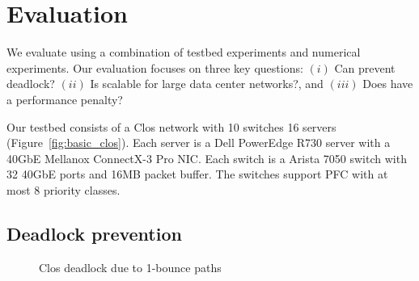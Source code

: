 \section{Evaluation}\label{sec:eval}

We evaluate \sysname{} using a combination of testbed experiments and numerical
experiments. Our evaluation focuses on three key questions: $(i)$ Can \sysname{}
prevent deadlock? $(ii)$ Is \sysname{} scalable for large data center networks?,
and $(iii)$ Does \sysname{} have a performance penalty?


 Our testbed consists of a Clos network with 10 switches 16
servers (Figure~\ref{fig:basic_clos}). Each server is a Dell PowerEdge R730
server with a 40GbE Mellanox ConnectX-3 Pro NIC. Each switch is a Arista
7050 switch with 32 40GbE ports and 16MB packet buffer. The switches
support PFC with at most 8 priority classes.




\subsection{Deadlock prevention}\label{subsec:exp_validation}

\begin{figure}[t]
	\centering
	
	
	\caption{Clos deadlock due to 1-bounce paths}\label{fig:exp_validation_nonloop}
	\vspace{-0.15in}
\end{figure}

